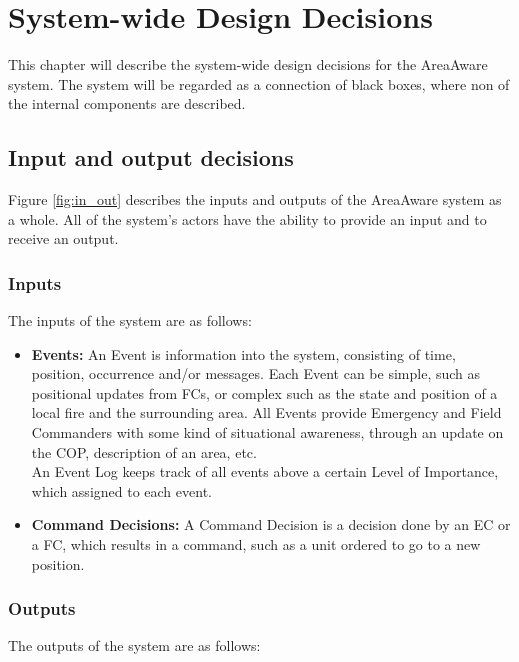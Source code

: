 \chapter{System-wide Design Decisions}
\label{chp:system-wide}

This chapter will describe the system-wide design decisions for the AreaAware system. The system will be regarded as a connection of black boxes, where non of the internal components are described.

\section{Input and output decisions}
Figure \ref{fig:in_out} describes the inputs and outputs of the AreaAware system as a whole. All of the system's actors have the ability to provide an input and to receive an output.\\


\subsection{Inputs}
The inputs of the system are as follows:

\begin{itemize}
	\item \textbf{Events:} An Event is information into the system, consisting of time, position, occurrence and/or messages. Each Event can be simple, such as positional updates from FCs, or complex such as the state and position of a local fire and the surrounding area. All Events provide Emergency and Field Commanders with some kind of situational awareness, through an update on the COP, description of an area, etc. \\
	An Event Log keeps track of all events above a certain Level of Importance, which assigned to each event.
	\item \textbf{Command Decisions:} A Command Decision is a decision done by an EC or a FC, which results in a command, such as a unit ordered to go to a new position.
\end{itemize}

\subsection{Outputs}
The outputs of the system are as follows:

